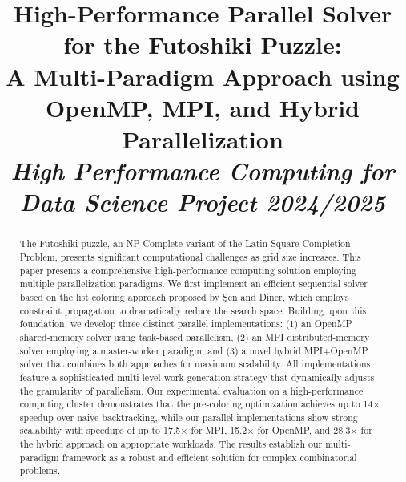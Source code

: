 \documentclass[10pt, conference]{IEEEtran}
\begin{document}
\title{High-Performance Parallel Solver for the Futoshiki Puzzle:\\
A Multi-Paradigm Approach using OpenMP, MPI, and Hybrid Parallelization\\
\normalsize \textit{High Performance Computing for Data Science Project 2024/2025}
}

\author{
\and
{}
\and
{}
}

\maketitle

\begin{abstract}
The Futoshiki puzzle, an NP-Complete variant of the Latin Square Completion Problem, presents significant computational challenges as grid size increases. This paper presents a comprehensive high-performance computing solution employing multiple parallelization paradigms. We first implement an efficient sequential solver based on the list coloring approach proposed by Şen and Diner, which employs constraint propagation to dramatically reduce the search space. Building upon this foundation, we develop three distinct parallel implementations: (1) an OpenMP shared-memory solver using task-based parallelism, (2) an MPI distributed-memory solver employing a master-worker paradigm, and (3) a novel hybrid MPI+OpenMP solver that combines both approaches for maximum scalability. All implementations feature a sophisticated multi-level work generation strategy that dynamically adjusts the granularity of parallelism. Our experimental evaluation on a high-performance computing cluster demonstrates that the pre-coloring optimization achieves up to 14× speedup over naive backtracking, while our parallel implementations show strong scalability with speedups of up to 17.5× for MPI, 15.2× for OpenMP, and 28.3× for the hybrid approach on appropriate workloads. The results establish our multi-paradigm framework as a robust and efficient solution for complex combinatorial problems.
\end{abstract}
\end{document}
